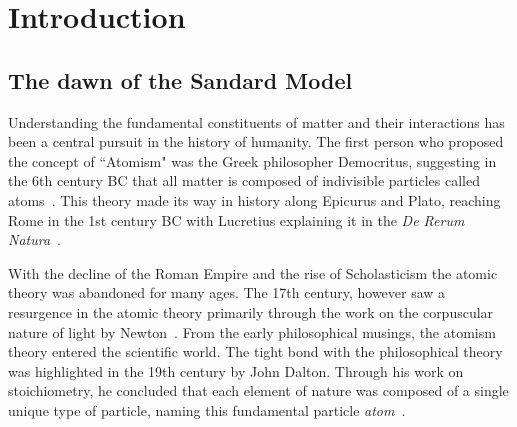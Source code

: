 \renewcommand{\chaptermark}[1]{\markboth{#1}{}}
\renewcommand{\sectionmark}[1]{\markright{#1}}
\fancyhead{} %
\fancyhead[LE]{\chaptername~\thechapter | \leftmark}
\fancyhead[RO]{\thesection~\rightmark}
\fancyfoot{} %
\fancyfoot[LE,RO]{\thepage}

    
\chapter{Introduction}
\label{chp:intro}
\section{The dawn of the Sandard Model}
Understanding the fundamental constituents of matter and their interactions has been a central pursuit in the history of humanity. The first person who proposed the concept of ``Atomism" was the Greek philosopher Democritus, suggesting in the 6th century BC that all matter is composed of indivisible particles called atoms~\cite{laertius1853lives}. 
This theory made its way in history along Epicurus and Plato, reaching Rome in the 1st century BC with Lucretius explaining it in the \textit{De Rerum Natura}~\cite{LucretiusCarus+2019}. 

With the decline of the Roman Empire and the rise of Scholasticism the atomic theory was abandoned for many ages. The 17th century, however saw a resurgence in the atomic theory primarily through the work on the corpuscular nature of light by Newton~\cite{Newton1704-NEWO}. From the early philosophical musings, the atomism theory entered the scientific world. The tight bond with the philosophical theory was highlighted in the 19th century by John Dalton. Through his work on stoichiometry, he concluded that each element of nature was composed of a single unique type of particle, naming this fundamental particle \textit{atom}~\cite{Dalton}. 

